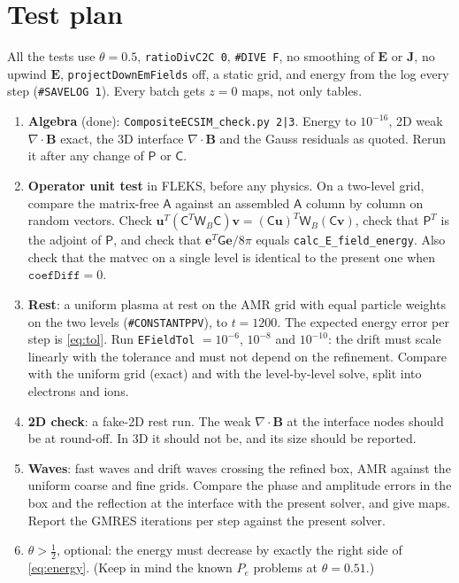 \documentclass[a4paper,11pt]{article}
\newcommand{\code}[1]{\texttt{#1}}
\newcommand{\EE}{\mathbf{e}}
\newcommand{\Pm}{\mathsf{P}}
\newcommand{\Cm}{\mathsf{C}}
\newcommand{\Gm}{\mathsf{G}}
\newcommand{\Wb}{\mathsf{W}_B}
\newcommand{\Am}{\mathsf{A}}
\begin{document}
\section{Test plan}\label{sec:tests}
All the tests use $\theta=0.5$, \code{ratioDivC2C 0}, \code{\#DIVE F}, no smoothing of
$\mathbf{E}$ or $\mathbf{J}$, no upwind $\mathbf{E}$, \code{projectDownEmFields} off, a static
grid, and energy from the log every step (\code{\#SAVELOG 1}). Every batch gets $z=0$ maps,
not only tables.
\begin{enumerate}[label=T\arabic*]
\item \textbf{Algebra} (done): \code{CompositeECSIM\_check.py 2|3}. Energy to $10^{-16}$,
  2D weak $\nabla\cdot\mathbf{B}$ exact, the 3D interface $\nabla\cdot\mathbf{B}$ and the
  Gauss residuals as quoted. Rerun it after any change of $\Pm$ or $\Cm$.
\item \textbf{Operator unit test} in FLEKS, before any physics. On a two-level grid,
  compare the matrix-free $\Am$ against an assembled $\Am$ column by column on random
  vectors. Check $\mathbf u^T(\Cm^T\Wb\Cm)\mathbf v=(\Cm\mathbf u)^T\Wb(\Cm\mathbf v)$, check that
  $\Pm^T$ is the adjoint of $\Pm$, and check that $\EE^T\Gm\EE/8\pi$ equals
  \code{calc\_E\_field\_energy}. Also check that the matvec on a single level is identical to
  the present one when $\code{coefDiff}=0$.
\item \textbf{Rest}: a uniform plasma at rest on the AMR grid with equal particle
  weights on the two levels (\code{\#CONSTANTPPV}), to $t=1200$.
  The expected energy error per step is \eqref{eq:tol}. Run \code{EFieldTol} $=10^{-6}$,
  $10^{-8}$ and $10^{-10}$: the drift must scale linearly with the tolerance and must not
  depend on the refinement. Compare with the uniform grid (exact) and with the
  level-by-level solve, split into electrons and ions.
\item \textbf{2D check}: a fake-2D rest run. The weak $\nabla\cdot\mathbf{B}$ at the
  interface nodes should be at round-off. In 3D it should not be, and its size should be
  reported.
\item \textbf{Waves}: fast waves and drift waves crossing the refined box, AMR
  against the uniform coarse and fine grids. Compare the phase and amplitude errors in
  the box and the reflection at the interface with the present solver, and give maps.
  Report the GMRES iterations per step against the present solver.
\item \textbf{$\theta>\frac12$}, optional: the energy must decrease by exactly the right side
  of \eqref{eq:energy}. (Keep in mind the known $P_e$ problems at $\theta=0.51$.)
\end{enumerate}
\end{document}
